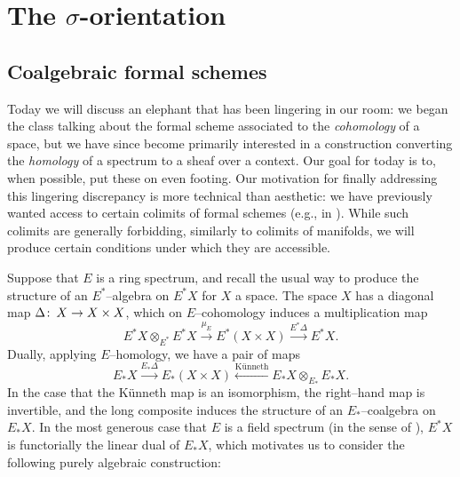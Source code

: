 
\chapter{The $\sigma$-orientation}\label{ChapterSigmaOrientation}







\section{Coalgebraic formal schemes}

Today we will discuss an elephant that has been lingering in our room: we began the class talking about the formal scheme associated to the \emph{cohomology} of a space, but we have since become primarily interested in a construction converting the \emph{homology} of a spectrum to a sheaf over a context.  Our goal for today is to, when possible, put these on even footing.  Our motivation for finally addressing this lingering discrepancy is more technical than aesthetic: we have previously wanted access to certain colimits of formal schemes (e.g., in ).  While such colimits are generally forbidding, similarly to colimits of manifolds, we will produce certain conditions under which they are accessible.

Suppose that $E$ is a ring spectrum, and recall the usual way to produce the structure of an $E^*$--algebra on $E^* X$ for $X$ a space.  The space $X$ has a diagonal map $\Delta\colon\thinspace X \to X \times X$, which on $E$--cohomology induces a multiplication map \[E^* X \otimes_{E^*} E^* X \xrightarrow{\mu_E} E^*(X \times X) \xrightarrow{E^* \Delta} E^* X.\]  Dually, applying $E$--homology, we have a pair of maps \[E_* X \xrightarrow{E_* \Delta} E_*(X \times X) \xleftarrow{\text{K\"unneth}} E_* X \otimes_{E_*} E_* X.\]  In the case that the K\"unneth map is an isomorphism, the right--hand map is invertible, and the long composite induces the structure of an $E_*$--coalgebra on $E_* X$.  In the most generous case that $E$ is a field spectrum (in the sense of ), $E^* X$ is functorially the linear dual of $E_* X$, which motivates us to consider the following purely algebraic construction:

